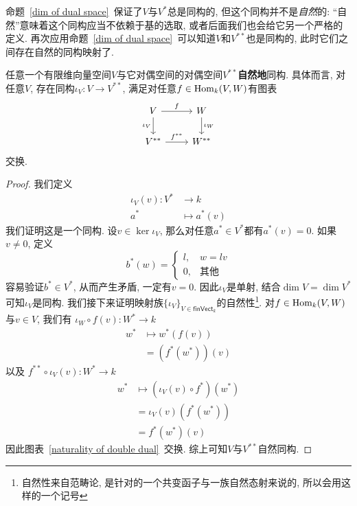 命题~\ref{dim of dual space}~保证了$V$与$V^*$总是同构的, 但这个同构并不是\textit{自然}的:
``自然''意味着这个同构应当不依赖于基的选取, 或者后面我们也会给它另一个严格的定义.
再次应用命题~\ref{dim of dual space}~可以知道$V$和$V^{**}$也是同构的, 此时它们之间存在自然的同构映射了.

\begin{prop}
    任意一个有限维向量空间$V$与它对偶空间的对偶空间$V^{**}$\textbf{自然地}同构.
    具体而言, 对任意$V$, 存在同构$\iota_V:V\to V^{**}$, 满足对任意$f\in\operatorname{Hom}_k(V,W)$有图表
    \begin{equation}
        \begin{tikzcd}
            V\arrow[r, "f"] \arrow[d, "\iota_V"'] & W \arrow[d, "\iota_W"]\\
            V^{**} \arrow[r, "f^{**}"] & W^{**}
        \end{tikzcd}\label{naturality of double dual}
    \end{equation}
    交换.
\end{prop}
\begin{proof}
    我们定义
    \begin{align*}
        \iota_V(v):V^*&\to k\\
        a^*&\mapsto a^*(v)
    \end{align*}
    我们证明这是一个同构.
    设$v\in\ker\iota_V$, 那么对任意$a^*\in V^*$都有$a^*(v)=0$.
    如果$v\neq 0$, 定义
    \[b^*(w)=\begin{cases}
        l, & w=lv\\
        0, & \text{其他}
    \end{cases}\]
    容易验证$b^*\in V^*$, 从而产生矛盾, 一定有$v=0$.
    因此$\iota_V$是单射, 结合$\dim V=\dim V^*$可知$\iota_V$是同构.
    我们接下来证明映射族$\{\iota_V\}_{V\in\mathsf{finVect}_k}$的自然性\footnote{自然性来自范畴论, 是针对的一个共变函子与一族自然态射来说的, 所以会用这样的一个记号}.
    对$f\in\operatorname{Hom}_k(V,W)$与$v\in V$, 我们有
    \(\iota_W\circ f(v):W^*\to k\)
    \begin{align*}
        w^*&\mapsto w^*(f(v))\\
        &=(f^*(w^*))(v)
    \end{align*}
    以及
    \(f^{**}\circ\iota_V(v):W^*\to k\)
    \begin{align*}
        w^*&\mapsto(\iota_V(v)\circ f^*)(w^*)\\
        &=\iota_V(v)(f^*(w^*))\\
        &=f^*(w^*)(v)
    \end{align*}
    因此图表~\eqref{naturality of double dual}~交换.
    综上可知$V$与$V^{**}$自然同构.
\end{proof}


